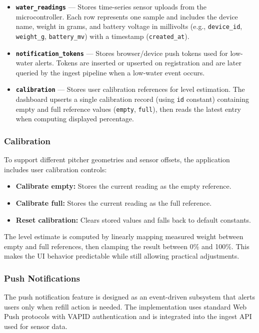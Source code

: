 \begin{itemize}
	\item \textbf{\texttt{water\_readings}} --- Stores time-series sensor uploads from the microcontroller. Each row represents one sample and includes the
	device name, weight in grams, and battery voltage in millivolts (e.g., \texttt{device\_id}, \texttt{weight\_g}, \texttt{battery\_mv}) with a timestamp (\texttt{created\_at}).

	\item \textbf{\texttt{notification\_tokens}} --- Stores browser/device push tokens used for low-water alerts. Tokens are inserted or upserted on
	registration and are later queried by the ingest pipeline when a low-water event occurs.

	\item \textbf{\texttt{calibration}} --- Stores user calibration references for level estimation. The dashboard upserts a single calibration record
	(using \texttt{id} constant) containing empty and full reference values (\texttt{empty}, \texttt{full}), then reads the latest entry when computing displayed percentage.
\end{itemize}

\subsubsection{Calibration}
To support different pitcher geometries and sensor offsets, the application includes user calibration controls:

\begin{itemize}
	\item \textbf{Calibrate empty:} Stores the current reading as the empty reference.
	\item \textbf{Calibrate full:} Stores the current reading as the full reference.
	\item \textbf{Reset calibration:} Clears stored values and falls back to default constants.
\end{itemize}

\noindent The level estimate is computed by linearly mapping measured weight between empty and full references, 
then clamping the result between 0\% and 100\%. This makes the UI behavior predictable while still allowing practical 
adjustments.

\subsubsection{Push Notifications}
The push notification feature is designed as an event-driven subsystem that alerts users only when refill action is needed. 
The implementation uses standard Web Push protocols with VAPID authentication and is integrated into the ingest API used for sensor data.

